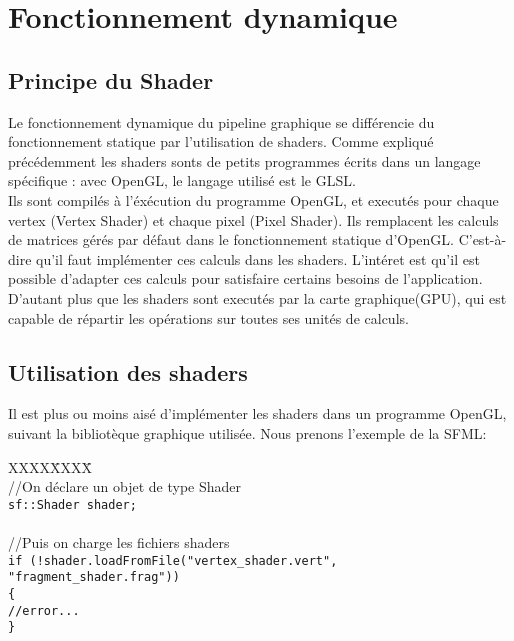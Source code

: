 \section{Fonctionnement dynamique}

\subsection{Principe du Shader}

Le fonctionnement dynamique du pipeline graphique se différencie du fonctionnement statique par l'utilisation de shaders.
Comme expliqué précédemment les shaders sonts de petits programmes écrits dans un langage spécifique : avec OpenGL, le langage utilisé est le GLSL.\\
Ils sont compilés à l'éxécution du programme OpenGL, et executés pour chaque vertex (Vertex Shader) et chaque pixel (Pixel Shader).
Ils remplacent les calculs de matrices gérés par défaut dans le fonctionnement statique d'OpenGL. C'est-à-dire qu'il faut implémenter ces calculs dans les shaders. L'intéret est qu'il est possible d'adapter ces calculs pour satisfaire certains besoins de l'application. D'autant plus que les shaders sont executés par la carte graphique(GPU), qui est capable de répartir les opérations sur toutes ses unités de calculs.

\subsection{Utilisation des shaders}

Il est plus ou moins aisé d'implémenter les shaders dans un programme OpenGL, suivant la bibliotèque graphique utilisée.
Nous prenons l'exemple de la SFML:\\

\begin{tabbing}
XXXX\=XXXX\= \kill\\
\> //On déclare un objet de type Shader\\
\> \verb|sf::Shader shader;|\\
\\
\>//Puis on charge les fichiers shaders\\
\> \verb|if (!shader.loadFromFile("vertex_shader.vert", "fragment_shader.frag"))|\\
\> \verb|{|\\
\> \>\verb|//error...|\\
\> \verb|}|\\
\end{tabbing}

